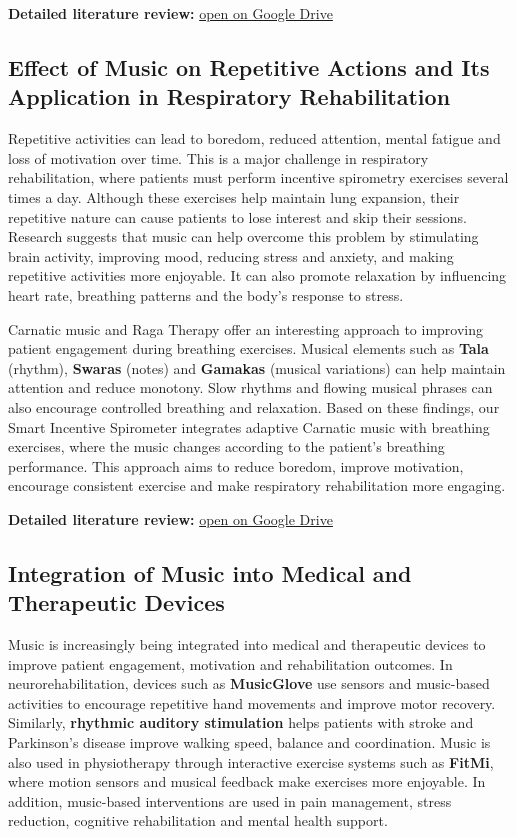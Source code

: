 \documentclass[12pt,a4paper]{article}
\begin{document}
\textbf{Detailed literature review:} \href{https://drive.google.com/file/d/1a6XYcWLQLeY2KC7Uo1gW1rZAXS7IFT5h/view?usp=sharing}{open on Google Drive}

\subsection{Effect of Music on Repetitive Actions and Its Application in Respiratory Rehabilitation}
Repetitive activities can lead to boredom, reduced attention, mental fatigue and loss of motivation over time. This is a major challenge in respiratory rehabilitation, where patients must perform incentive spirometry exercises several times a day. Although these exercises help maintain lung expansion, their repetitive nature can cause patients to lose interest and skip their sessions. Research suggests that music can help overcome this problem by stimulating brain activity, improving mood, reducing stress and anxiety, and making repetitive activities more enjoyable. It can also promote relaxation by influencing heart rate, breathing patterns and the body's response to stress.

Carnatic music and Raga Therapy offer an interesting approach to improving patient engagement during breathing exercises. Musical elements such as \textbf{Tala} (rhythm), \textbf{Swaras} (notes) and \textbf{Gamakas} (musical variations) can help maintain attention and reduce monotony. Slow rhythms and flowing musical phrases can also encourage controlled breathing and relaxation. Based on these findings, our Smart Incentive Spirometer integrates adaptive Carnatic music with breathing exercises, where the music changes according to the patient's breathing performance. This approach aims to reduce boredom, improve motivation, encourage consistent exercise and make respiratory rehabilitation more engaging.

\textbf{Detailed literature review:} \href{https://drive.google.com/file/d/1lcXps6f7-bh9NBYqo6oUohZf7O_6DQMv/view?usp=sharing}{open on Google Drive}

\subsection{Integration of Music into Medical and Therapeutic Devices}
Music is increasingly being integrated into medical and therapeutic devices to improve patient engagement, motivation and rehabilitation outcomes. In neurorehabilitation, devices such as \textbf{MusicGlove} use sensors and music-based activities to encourage repetitive hand movements and improve motor recovery. Similarly, \textbf{rhythmic auditory stimulation} helps patients with stroke and Parkinson's disease improve walking speed, balance and coordination. Music is also used in physiotherapy through interactive exercise systems such as \textbf{FitMi}, where motion sensors and musical feedback make exercises more enjoyable. In addition, music-based interventions are used in pain management, stress reduction, cognitive rehabilitation and mental health support.
\end{document}
